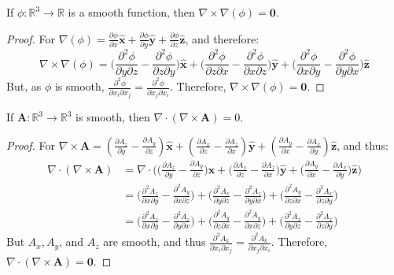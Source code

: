 \documentclass[crop=false,class=book,oneside]{standalone}
\begin{document}
\begin{theorem}
If $\phi:\mathbb{R}^{3}\rightarrow \mathbb{R}$ is a smooth function, then $\nabla \times \nabla(\phi) = \boldsymbol{0}$.
\end{theorem}
\begin{proof}
For $\nabla(\phi) = \frac{\partial \phi}{\partial x}\hat{\mathbf{x}}+\frac{\partial \phi}{\partial y}\hat{\mathbf{y}}+\frac{\partial \phi}{\partial z}\hat{\mathbf{z}}$, and therefore:
\begin{equation*}
    \nabla \times \nabla(\phi) = \bigg(\frac{\partial^{2} \phi}{\partial y \partial z} - \frac{\partial^{2}\phi}{\partial z \partial y}\bigg)\hat{\mathbf{x}}+\bigg(\frac{\partial^{2} \phi}{\partial z \partial x} - \frac{\partial^{2}\phi}{\partial x \partial z}\bigg)\hat{\mathbf{y}}+\bigg(\frac{\partial^{2} \phi}{\partial x \partial y} - \frac{\partial^{2}\phi}{\partial y \partial x}\bigg)\hat{\mathbf{z}}
\end{equation*}
But, as $\phi$ is smooth, $\frac{\partial^{2}\phi}{\partial x_{i}\partial x_{j}} = \frac{\partial^{2}\phi}{\partial x_{j}\partial x_{i}}$. Therefore, $\nabla \times \nabla(\phi) = \boldsymbol{0}$.
\end{proof}
\begin{theorem}
If $\mathbf{A}:\mathbb{R}^{3}\rightarrow \mathbb{R}^{3}$ is smooth, then $\nabla\cdot(\nabla \times \mathbf{A}) = 0$.
\end{theorem}
\begin{proof}
For $\nabla \times \mathbf{A} = (\frac{\partial A_{z}}{\partial y} - \frac{\partial A_{y}}{\partial z})\hat{\mathbf{x}}+(\frac{\partial A_{x}}{\partial z} - \frac{\partial A_{z}}{\partial x})\hat{\mathbf{y}}+(\frac{\partial A_{y}}{\partial x} - \frac{\partial A_{x}}{\partial y})\hat{\mathbf{z}}$, and thus:
\begin{align*}
    \nabla \cdot (\nabla \times \mathbf{A}) &=\nabla \cdot \bigg(\big(\frac{\partial A_{z}}{\partial y} - \frac{\partial A_{y}}{\partial z}\big)\hat{\mathbf{x}}+\big(\frac{\partial A_{x}}{\partial z} - \frac{\partial A_{z}}{\partial x}\big)\hat{\mathbf{y}}+\big(\frac{\partial A_{y}}{\partial x} - \frac{\partial A_{x}}{\partial y}\big)\hat{\mathbf{z}}\bigg)\\
    &=\bigg(\frac{\partial^{2}A_{z}}{\partial x \partial y} - \frac{\partial^{2}A_{y}}{\partial x \partial z}\bigg)+\bigg(\frac{\partial^{2}A_{x}}{\partial y \partial z} - \frac{\partial^{2}A_{z}}{\partial y \partial x}\bigg) + \bigg(\frac{\partial^{2} A_{y}}{\partial z \partial x} - \frac{\partial^{2} A_{x}}{\partial z \partial y}\bigg)\\
    &= \bigg(\frac{\partial^{2} A_{z}}{\partial x \partial y} - \frac{\partial^{2} A_{z}}{\partial y \partial x}\bigg) + \bigg(\frac{\partial^{2} A_{y}}{\partial z \partial x} - \frac{\partial^{2} A_{y}}{\partial x \partial z}\bigg) + \bigg(\frac{\partial^{2}A_{x}}{\partial y \partial z} - \frac{\partial^{2} A_{x}}{\partial z \partial y}\bigg)
\end{align*}
But $A_{x},A_{y}$, and $A_{z}$ are smooth, and thus $\frac{\partial^{2} A_{k}}{\partial x_{i} \partial x_{j}} = \frac{\partial^{2} A_{k}}{\partial x_{j} \partial x_{i}}$. Therefore, $\nabla \cdot (\nabla \times \mathbf{A}) = \boldsymbol{0}$.
\end{proof}
\end{document}
